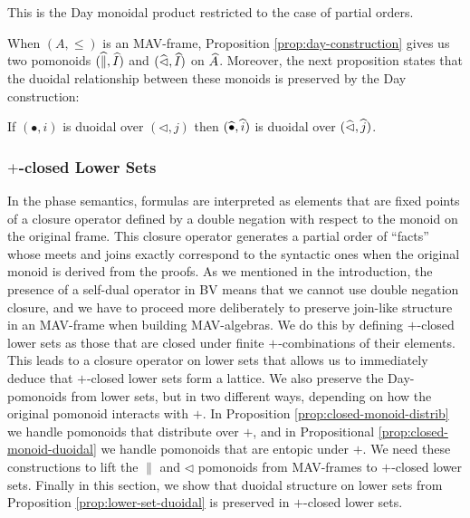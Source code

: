 \begin{remark}
  This is the Day monoidal product \cite{day} restricted to the case
  of partial orders.
\end{remark}

\begin{remark}
  When $(A, \leq)$ is an MAV-frame, Proposition
  \ref{prop:day-construction} gives us two pomonoids
  $(\mathop{\widehat{\parallel}}, \mathop{\widehat{I}})$ and $(\mathop{\widehat{\lhd}}, \mathop{\widehat{I}})$ on
  $\widehat{A}$. Moreover, the next proposition states that the
  duoidal relationship between these monoids is preserved by the Day
  construction:
\end{remark}

\begin{proposition}\label{prop:lower-set-duoidal}
  If $(\bullet, i)$ is duoidal over $(\lhd, j)$ then
  $(\mathop{\widehat{\bullet}}, \mathop{\widehat{i}})$ is duoidal over $(\mathop{\widehat{\lhd}}, \mathop{\widehat{j}})$.
\end{proposition}

\subsubsection{$+$-closed Lower Sets}
\label{sec:closed-lower-sets}

In the phase semantics, formulas are interpreted as elements that are
fixed points of a closure operator defined by a double negation with
respect to the monoid on the original frame. This closure operator
generates a partial order of ``facts'' whose meets and joins exactly
correspond to the syntactic ones when the original monoid is derived
from the proofs. As we mentioned in the introduction, the presence of
a self-dual operator in BV means that we cannot use double negation
closure, and we have to proceed more deliberately to preserve
join-like structure in an MAV-frame when building MAV-algebras. We do
this by defining $+$-closed lower sets as those that are closed under
finite $+$-combinations of their elements. This leads to a closure
operator on lower sets that allows us to immediately deduce that
$+$-closed lower sets form a lattice. We also preserve the
Day-pomonoids from lower sets, but in two different ways, depending on
how the original pomonoid interacts with $+$. In Proposition
\ref{prop:closed-monoid-distrib} we handle pomonoids that distribute
over $+$, and in Propositional \ref{prop:closed-monoid-duoidal} we
handle pomonoids that are entopic under $+$. We need these
constructions to lift the $\parallel$ and $\lhd$ pomonoids from
MAV-frames to $+$-closed lower sets. Finally in this section, we show
that duoidal structure on lower sets from Proposition
\ref{prop:lower-set-duoidal} is preserved in $+$-closed lower sets.


